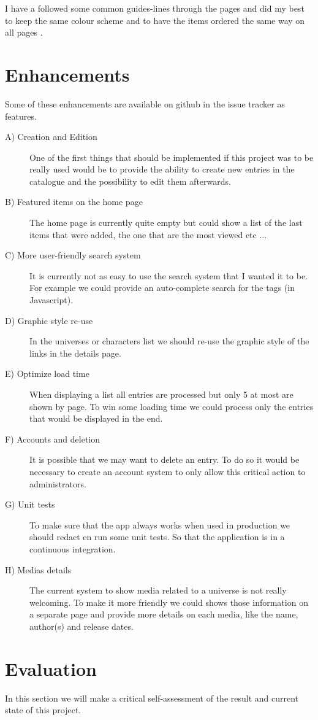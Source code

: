 \documentclass[10pt, a4paper]{article}
\begin{document}
	I have a followed some common guides-lines through the pages and did my best to keep the same colour scheme and to have the items ordered the same way on all pages .
	
	\section{Enhancements}
	Some of these enhancements are available on github in the issue tracker as features.
	\begin{description}
		\item[A) Creation and Edition] One of the first things that should be implemented if this project was to be really used would be to provide the ability to create new entries in the catalogue and the possibility to edit them afterwards.
		\item[B) Featured items on the home page] The home page is currently quite empty but could show a list of the last items that were added, the one that are the most viewed etc ...
		\item[C) More user-friendly search system] It is currently not as easy to use the search system that I wanted it to be. For example we could provide an auto-complete search for the tags (in Javascript).
		\item[D) Graphic style re-use] In the universes or characters list we should re-use the graphic style of the links in the details page. 
		\item[E) Optimize load time] When displaying a list all entries are processed but only 5 at most are shown by page. To win some loading time we could process only the entries that would be displayed in the end. 
		\item[F) Accounts and deletion] It is possible that we may want to delete an entry. To do so it would be necessary to create an account system to only allow this critical action to administrators.
		\item[G) Unit tests] To make sure that the app always works when used in production we should redact en run some unit tests. So that the application is in a continuous integration.
		\item[H) Medias details] The current system to show media related to a universe is not really welcoming. To make it more friendly we could shows those information on a separate page and provide more details on each media, like the name, author(s) and release dates.
	\end{description}
	
	\section{Evaluation}
	In this section we will make a critical self-assessment of the result and current state of this project. 
	
\end{document}
